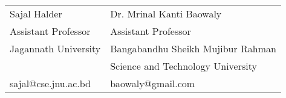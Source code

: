 \documentclass[]{deedy-resume-openfont}
\begin{document}
\begin{minipage}[t]{0.66\textwidth}



\begin{tabular}{ll}
	Sajal Halder & Dr. Mrinal Kanti Baowaly\\
	Assistant Professor & Assistant Professor\\
	Jagannath University & Bangabandhu Sheikh Mujibur Rahman\\
	& Science and Technology University \\
	sajal@cse.jnu.ac.bd & baowaly@gmail.com\\
\end{tabular}

\sectionsep

\end{minipage} 
\end{document}
